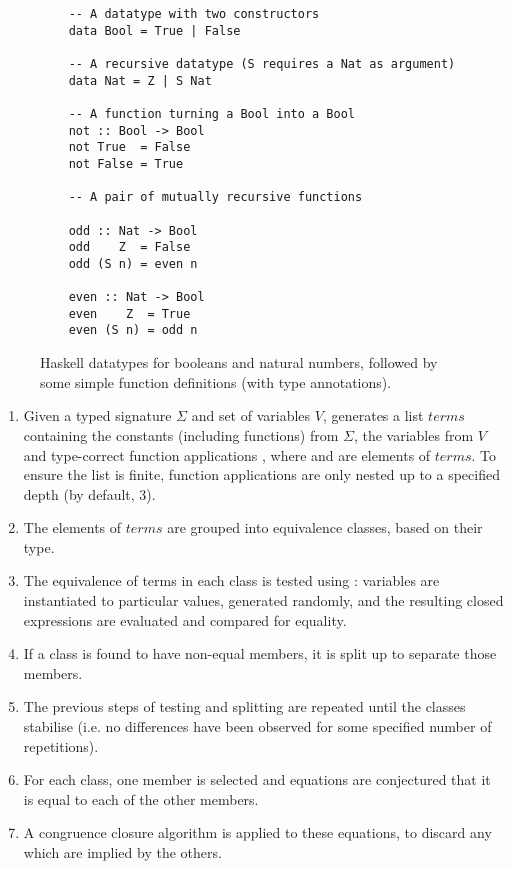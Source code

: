 \iffalse %
 V \in Var
 F \in Fun
 T \in Term
 T ::= V | F | T1 T2

 Term ::= VAR | Const | Fun (Term)
or
 Term t ::= x | f | t t'
\fi


\begin{figure}
  \centering
  \begin{verbatim}
    -- A datatype with two constructors
    data Bool = True | False

    -- A recursive datatype (S requires a Nat as argument)
    data Nat = Z | S Nat

    -- A function turning a Bool into a Bool
    not :: Bool -> Bool
    not True  = False
    not False = True

    -- A pair of mutually recursive functions

    odd :: Nat -> Bool
    odd    Z  = False
    odd (S n) = even n

    even :: Nat -> Bool
    even    Z  = True
    even (S n) = odd n
  \end{verbatim}
  \caption{Haskell datatypes for booleans and natural numbers, followed by some
    simple function definitions (with type annotations).}
  \label{fig:haskellexample}
\end{figure}

\begin{enumerate}
\item Given a typed signature $\Sigma$ and set of variables $V$, \qspec{}
  generates a list $terms$ containing the constants (including functions) from
  $\Sigma$, the variables from $V$ and type-correct function applications
  , where  and  are elements of $terms$. To ensure the list
  is finite, function applications are only nested up to a specified depth (by
  default, 3).
\item The elements of $terms$ are grouped into equivalence classes, based on
  their type.
\item The equivalence of terms in each class is tested using \qcheck{}:
  variables are instantiated to particular values, generated randomly, and the
  resulting closed expressions are evaluated and compared for equality.
\item If a class is found to have non-equal members, it is split up to separate
  those members.
\item The previous steps of testing and splitting are repeated until the classes
  stabilise (i.e. no differences have been observed for some specified number of
  repetitions).
\item For each class, one member is selected and equations are conjectured that
  it is equal to each of the other members.
\item A congruence closure algorithm is applied to these equations, to discard
  any which are implied by the others.
\end{enumerate}


